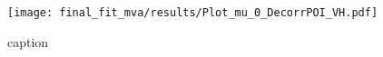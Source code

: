\begin{figure}[!htbp]
	\centering
	\texttt{[image: final\_fit\_mva/results/Plot\_mu\_0\_DecorrPOI\_VH.pdf]}
  \caption{caption}
  \label{fig:channels-mus}
\end{figure}